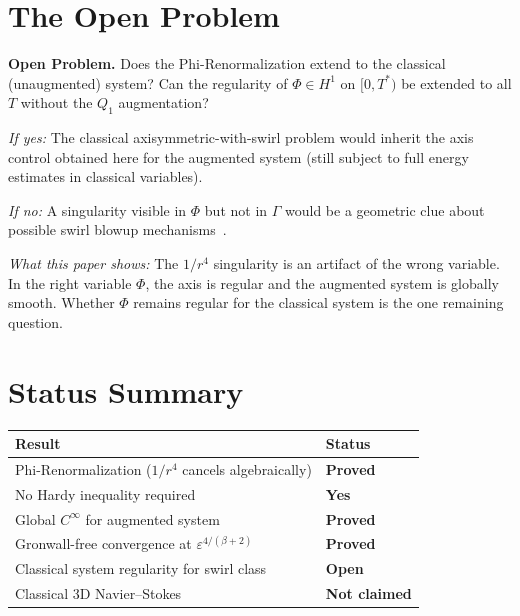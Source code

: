 \documentclass[11pt]{article}
\newcommand{\eps}{\varepsilon}
\begin{document}
\section{The Open Problem}
\label{sec:open}

\begin{mdframed}[linecolor=open,linewidth=1.2pt,backgroundcolor=lightred]
\textbf{Open Problem.}
Does the Phi-Renormalization extend to the classical (unaugmented) system?
Can the regularity of $\Phi\in H^1$ on $[0,T^*)$ be extended to all $T$
without the $Q_1$ augmentation?

\medskip
\textit{If yes:} The classical axisymmetric-with-swirl problem would inherit the
axis control obtained here for the augmented system (still subject to full
energy estimates in classical variables).

\textit{If no:} A singularity visible in $\Phi$ but not in $\Gamma$ would be a
geometric clue about possible swirl blowup mechanisms~\cite{BKM1984}.

\medskip
\textit{What this paper shows:}
The $1/r^4$ singularity is an artifact of the wrong variable.
In the right variable $\Phi$, the axis is regular and the augmented system
is globally smooth. Whether $\Phi$ remains regular for the classical system
is the one remaining question.
\end{mdframed}

\section{Status Summary}

\begin{center}
\begin{tabular}{>{\raggedright\arraybackslash}p{9cm}>{\centering\arraybackslash}p{3cm}}
\toprule
\textbf{Result} & \textbf{Status}\\
\midrule
\rowcolor{lightgreen}
Phi-Renormalization ($1/r^4$ cancels algebraically) & \textcolor{proved}{\textbf{Proved}} \\
\rowcolor{lightgreen}
No Hardy inequality required & \textcolor{proved}{\textbf{Yes}} \\
\rowcolor{lightgreen}
Global $C^\infty$ for augmented system & \textcolor{proved}{\textbf{Proved}} \\
\rowcolor{lightgreen}
Gronwall-free convergence at $\eps^{4/(\beta+2)}$ & \textcolor{proved}{\textbf{Proved}} \\
\midrule
\rowcolor{lightred}
Classical system regularity for swirl class & \textcolor{open}{\textbf{Open}} \\
\rowcolor{lightgray}
Classical 3D Navier--Stokes & \textcolor{notclaimed}{\textbf{Not claimed}} \\
\bottomrule
\end{tabular}
\end{center}
\end{document}
